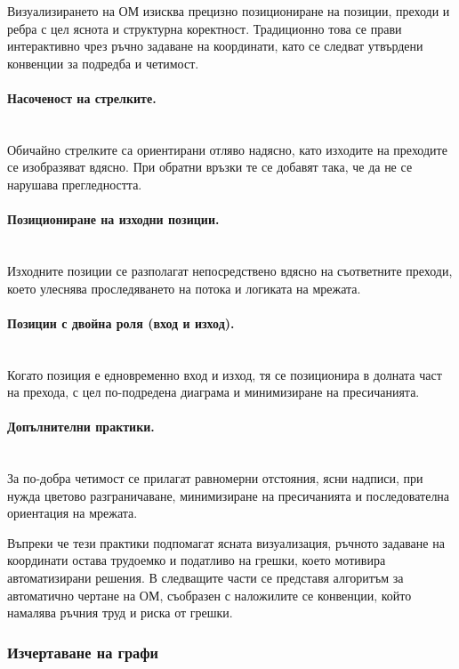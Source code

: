\hspace*{2.5em}Визуализирането на ОМ изисква прецизно позициониране на позиции, преходи и ребра с цел яснота и структурна коректност. Традиционно това се прави интерактивно чрез ръчно задаване на координати, като се следват утвърдени конвенции за подредба и четимост.

\paragraph{Насоченост на стрелките.}
\mbox{}\\
Обичайно стрелките са ориентирани отляво надясно, като изходите на преходите се изобразяват вдясно. При обратни връзки те се добавят така, че да не се нарушава прегледността.

\paragraph{Позициониране на изходни позиции.}
\mbox{}\\
Изходните позиции се разполагат непосредствено вдясно на съответните преходи, което улеснява проследяването на потока и логиката на мрежата.

\paragraph{Позиции с двойна роля (вход и изход).}
\mbox{}\\
Когато позиция е едновременно вход и изход, тя се позиционира в долната част на прехода, с цел по-подредена диаграма и минимизиране на пресичанията.

\paragraph{Допълнителни практики.}
\mbox{}\\
За по-добра четимост се прилагат равномерни отстояния, ясни надписи, при нужда цветово разграничаване, минимизиране на пресичанията и последователна ориентация на мрежата.

Въпреки че тези практики подпомагат ясната визуализация, ръчното задаване на координати остава трудоемко и податливо на грешки, което мотивира автоматизирани решения. В следващите части се представя алгоритъм за автоматично чертане на ОМ, съобразен с наложилите се конвенции, който намалява ръчния труд и риска от грешки.

\subsubsection{Изчертаване на графи}

